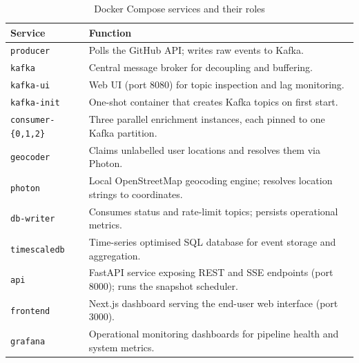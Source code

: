 \documentclass[sigconf]{acmart}
\begin{document}
\begin{table}[ht]
  \caption{Docker Compose services and their roles}
  \label{tab:services}
  \begin{tabularx}{\linewidth}{l X}
    \toprule
    \textbf{Service} & \textbf{Function} \\
    \midrule
    \texttt{producer}           & Polls the GitHub API; writes raw events to Kafka. \\
    \texttt{kafka}              & Central message broker for decoupling and buffering. \\
    \texttt{kafka-ui}           & Web UI (port 8080) for topic inspection and lag monitoring. \\
    \texttt{kafka-init}         & One-shot container that creates Kafka topics on first start. \\
    \texttt{consumer-\{0,1,2\}} & Three parallel enrichment instances, each pinned to one Kafka partition. \\
    \texttt{geocoder}           & Claims unlabelled user locations and resolves them via Photon. \\
    \texttt{photon}             & Local OpenStreetMap geocoding engine; resolves location strings to coordinates. \\
    \texttt{db-writer}          & Consumes status and rate-limit topics; persists operational metrics. \\
    \texttt{timescaledb}        & Time-series optimised SQL database for event storage and aggregation. \\
    \texttt{api}                & FastAPI service exposing REST and SSE endpoints (port 8000); runs the snapshot scheduler. \\
    \texttt{frontend}           & Next.js dashboard serving the end-user web interface (port 3000). \\
    \texttt{grafana}~\cite{grafana} & Operational monitoring dashboards for pipeline health and system metrics. \\
    \bottomrule
  \end{tabularx}
\end{table}
\end{document}
